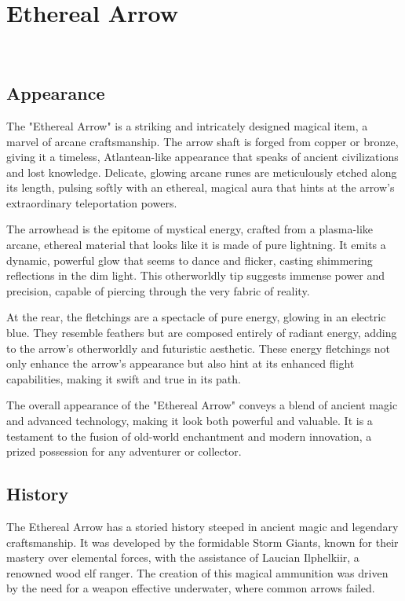 
\chapter*{Ethereal Arrow}
\\

\section*{Appearance}

The "Ethereal Arrow" is a striking and intricately designed magical item, a marvel of arcane craftsmanship. The arrow shaft is forged from copper or bronze, giving it a timeless, Atlantean-like appearance that speaks of ancient civilizations and lost knowledge. Delicate, glowing arcane runes are meticulously etched along its length, pulsing softly with an ethereal, magical aura that hints at the arrow's extraordinary teleportation powers.

The arrowhead is the epitome of mystical energy, crafted from a plasma-like arcane, ethereal material that looks like it is made of pure lightning. It emits a dynamic, powerful glow that seems to dance and flicker, casting shimmering reflections in the dim light. This otherworldly tip suggests immense power and precision, capable of piercing through the very fabric of reality.

At the rear, the fletchings are a spectacle of pure energy, glowing in an electric blue. They resemble feathers but are composed entirely of radiant energy, adding to the arrow's otherworldly and futuristic aesthetic. These energy fletchings not only enhance the arrow's appearance but also hint at its enhanced flight capabilities, making it swift and true in its path.

The overall appearance of the "Ethereal Arrow" conveys a blend of ancient magic and advanced technology, making it look both powerful and valuable. It is a testament to the fusion of old-world enchantment and modern innovation, a prized possession for any adventurer or collector.

\section*{History}

The Ethereal Arrow has a storied history steeped in ancient magic and legendary craftsmanship. It was developed by the formidable Storm Giants, known for their mastery over elemental forces, with the assistance of Laucian Ilphelkiir, a renowned wood elf ranger. The creation of this magical ammunition was driven by the need for a weapon effective underwater, where common arrows failed.

